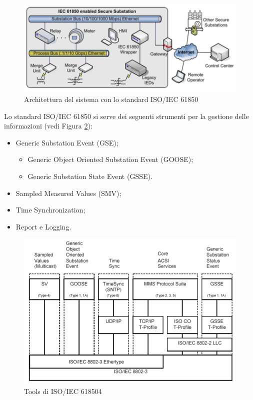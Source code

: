 \begin{figure}[h]
	\centering
	\includegraphics[scale=0.450]{imgs/arch_iec61850.png}
	\caption{Architettura del sistema con lo standard ISO/IEC 61850} \label{fig:arch_iec61850}
\end{figure}
\newpage
Lo standard ISO/IEC 61850 si serve dei seguenti strumenti per la gestione delle informazioni (vedi Figura \ref{fig:tools_iec61850}):
\begin{itemize}
	\item Generic Substation Event (GSE);
	\begin{itemize}
		\item Generic Object Oriented Substation Event (GOOSE);
		\item Generic Substation State Event (GSSE).
	\end{itemize}
	\item Sampled Measured Values (SMV);
	\item Time Synchronization;
	\item Report e Logging.
\end{itemize}
\begin{figure}[h]
	\centering
	\includegraphics[scale=0.350]{imgs/tools_iec61850.png}
	\caption{Tools di ISO/IEC 618504} \label{fig:tools_iec61850}
\end{figure}
